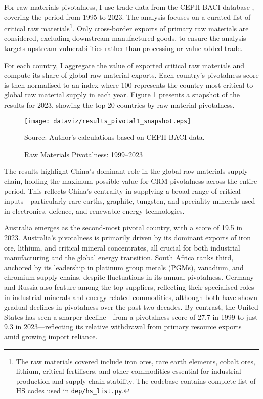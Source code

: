 \documentclass[11pt]{article}
\begin{document}
For raw materials pivotalness, I use trade data from the CEPII BACI database \citep{baci2023}, covering the period from 1995 to 2023. The analysis focuses on a curated list of critical raw materials\footnote{The raw materials covered include iron ores, rare earth elements, cobalt ores, lithium, critical fertilisers, and other commodities essential for industrial production and supply chain stability. The codebase contains complete list of HS codes used in \texttt{dep/hs\_list.py}.}. Only cross-border exports of primary raw materials are considered, excluding downstream manufactured goods, to ensure the analysis targets upstream vulnerabilities rather than processing or value-added trade.

For each country, I aggregate the value of exported critical raw materials and compute its share of global raw material exports. Each country’s pivotalness score is then normalised to an index where 100 represents the country most critical to global raw material supply in each year. Figure \ref{fig:pivotal_raw} presents a snapshot of the results for 2023, showing the top 20 countries by raw material pivotalness.

\begin{figure}[H]
	\caption{Raw Materials Pivotalness: 1999–2023}
	\label{fig:pivotal_raw}
	\centering
        \phantom{a}
	\texttt{[image: dataviz/results\_pivotal1\_snapshot.eps]}

	{\footnotesize Source: Author's calculations based on CEPII BACI data.}
\end{figure}

The results highlight China's dominant role in the global raw materials supply chain, holding the maximum possible value for CRM pivotalness across the entire period. This reflects China’s centrality in supplying a broad range of critical inputs—particularly rare earths, graphite, tungsten, and speciality minerals used in electronics, defence, and renewable energy technologies.

Australia emerges as the second-most pivotal country, with a score of 19.5 in 2023. Australia's pivotalness is primarily driven by its dominant exports of iron ore, lithium, and critical mineral concentrates, all crucial for both industrial manufacturing and the global energy transition. South Africa ranks third, anchored by its leadership in platinum group metals (PGMs), vanadium, and chromium supply chains, despite fluctuations in its annual pivotalness. Germany and Russia also feature among the top suppliers, reflecting their specialised roles in industrial minerals and energy-related commodities, although both have shown gradual declines in pivotalness over the past two decades. By contrast, the United States has seen a sharper decline—from a pivotalness score of 27.7 in 1999 to just 9.3 in 2023—reflecting its relative withdrawal from primary resource exports amid growing import reliance.
\end{document}
